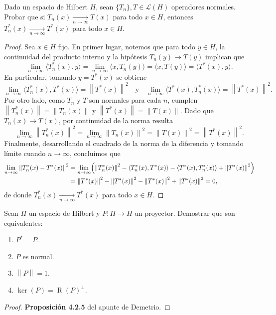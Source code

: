 \documentclass{article}
\theoremstyle{definition}
\newcommand{\norm}[1]{\left\lVert #1 \right\rVert}       %
\newcommand{\LH}{\mathcal{L}(H)}                         %
\newcommand{\Ker}{\operatorname{ker}}                    %
\newcommand{\Ran}{\operatorname{R}}                      %
\newenvironment{ejercicio}[1]{\begin{trivlist}
\item[\hskip \labelsep {\bfseries Ejercicio}\hskip \labelsep {\bfseries #1.}]}{\end{trivlist}}
\begin{document}
\vspace{0.5cm}

\begin{ejercicio}{4}
	Dado un espacio de Hilbert \( H \), sean \( \{T_n\}, T \in \LH \) operadores normales. Probar que si \( T_n(x) \xrightarrow[n \to \infty]{} T(x) \) para todo \( x \in H \), entonces \( T_n^*(x) \xrightarrow[n \to \infty]{} T^*(x) \) para todo \( x \in H \).
\end{ejercicio}
\begin{proof}
	Sea \( x \in H \) fijo. En primer lugar, notemos que para todo \( y \in H \), la continuidad del producto interno y la hipótesis \( T_n(y) \to T(y) \) implican que
	\[
		\lim_{n \to \infty} \langle T_n^*(x), y \rangle = \lim_{n \to \infty} \langle x, T_n(y) \rangle = \langle x, T(y) \rangle = \langle T^*(x), y \rangle.
	\]
	En particular, tomando \( y = T^*(x) \) se obtiene
	\[
		\lim_{n \to \infty} \langle T_n^*(x), T^*(x) \rangle = \norm{T^*(x)}^2 \quad \text{y} \quad \lim_{n \to \infty} \langle T^*(x), T_n^*(x) \rangle = \norm{T^*(x)}^2.
	\]
	Por otro lado, como \( T_n \) y \( T \) son normales para cada \( n \), cumplen \( \norm{T_n^*(x)} = \norm{T_n(x)} \) y \( \norm{T^*(x)} = \norm{T(x)} \). Dado que \( T_n(x) \to T(x) \), por continuidad de la norma resulta
	\[
		\lim_{n \to \infty} \norm{T_n^*(x)}^2 = \lim_{n \to \infty} \norm{T_n(x)}^2 = \norm{T(x)}^2 = \norm{T^*(x)}^2.
	\]
	Finalmente, desarrollando el cuadrado de la norma de la diferencia y tomando límite cuando \( n \to \infty \), concluimos que
	\begin{align*}
		\lim_{n \to \infty} \norm{T_n^*(x) - T^*(x)}^2 & = \lim_{n \to \infty} \Bigl( \norm{T_n^*(x)}^2 - \langle T_n^*(x), T^*(x) \rangle - \langle T^*(x), T_n^*(x) \rangle + \norm{T^*(x)}^2 \Bigr) \\
		                                               & = \norm{T^*(x)}^2 - \norm{T^*(x)}^2 - \norm{T^*(x)}^2 + \norm{T^*(x)}^2 = 0,
	\end{align*}
	de donde \( T_n^*(x) \xrightarrow[n \to \infty]{} T^*(x) \) para todo \( x \in H \).
\end{proof}

\vspace{0.5cm}

\begin{ejercicio}{5}
	Sean \( H \) un espacio de Hilbert y \( P : H \to H \) un proyector. Demostrar que son equivalentes:
	\begin{enumerate}
		\item \( P^* = P \).
		\item \( P \) es normal.
		\item \( \norm{P} = 1 \).
		\item \( \Ker(P) = {\Ran(P)}^{\perp} \).
	\end{enumerate}
\end{ejercicio}
\begin{proof}
	\textbf{Proposición 4.2.5} del apunte de Demetrio.
\end{proof}
\end{document}
